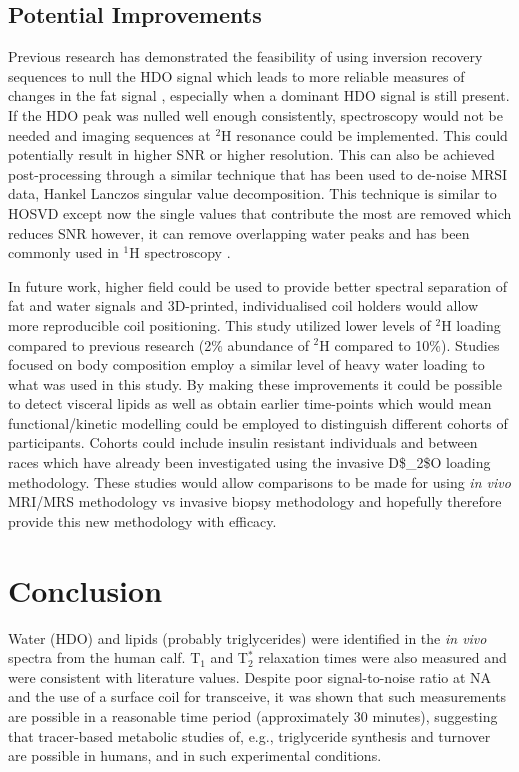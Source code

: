 \subsection{Potential Improvements}

Previous research has demonstrated the feasibility of using inversion recovery sequences to null the HDO signal which leads to more reliable measures of changes in the fat signal \cite{Brereton1989TheMice}, especially when a dominant \ac{HDO} signal is still present. If the \ac{HDO} peak was nulled well enough consistently, spectroscopy would not be needed and imaging sequences at $^2$H resonance could be implemented. This could potentially result in higher \ac{SNR} or higher resolution. This can also be achieved post-processing through a similar technique that has been used to de-noise \ac{MRSI} data, Hankel Lanczos singular value decomposition. This technique is similar to \ac{HOSVD} except now the single values that contribute the most are removed which reduces SNR however, it can remove overlapping water peaks and has been commonly used in $^1$H spectroscopy \cite{Jansen20061HMetabolites, Cabanes2001OptimizationBrain}.

In future work, higher field could be used to provide better spectral separation of fat and water signals and 3D-printed, individualised coil holders would allow more reproducible coil positioning. This study utilized lower levels of $^2$H loading compared to previous research (2\% abundance of $^2$H compared to 10\%). Studies focused on body composition employ a similar level of heavy water loading to what was used in this study. By making these improvements it could be possible to detect visceral lipids as well as obtain earlier time-points which would mean functional/kinetic modelling could be employed to distinguish different cohorts of participants. Cohorts could include insulin resistant individuals \cite{White2017AssociationHumans} and between races \cite{White2018RacialHumans} which have already been investigated using the invasive \ac{D$_2$O} loading methodology. These studies would allow comparisons to be made for using \textit{in vivo} \ac{MRI}/\ac{MRS} methodology vs invasive biopsy methodology and hopefully therefore provide this new methodology with efficacy.

\section{Conclusion}

Water (\ac{HDO}) and lipids (probably triglycerides) were identified in the \textit{in vivo} spectra from the human calf. T$_1$ and T$_2^*$ relaxation times were also measured and were consistent with literature values. Despite poor signal-to-noise ratio at \ac{NA} and the use of a surface coil for transceive, it was shown that such measurements are possible in a reasonable time period (approximately 30 minutes), suggesting that tracer-based metabolic studies of, e.g., triglyceride synthesis and turnover are possible in humans, and in such experimental conditions.  

